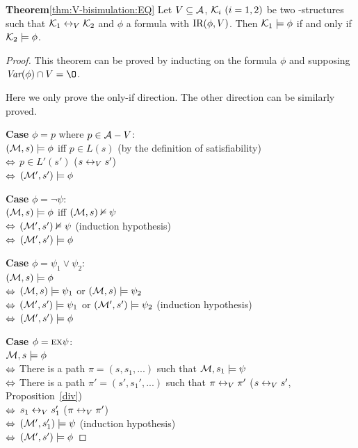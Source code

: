 \documentclass{article}
\begin{document}
\textbf{Theorem}\ref{thm:V-bisimulation:EQ}
Let $V\subseteq\cal A$, ${\cal K}_i~(i=1,2)$ be two \MPK-structures such that
  ${\cal K}_1\leftrightarrow_V{\cal K}_2$ and $\phi$ a formula with $\textrm{IR}(\phi,V)$. Then
  ${\cal K}_1\models\phi$ if and only if ${\cal K}_2\models\phi$.\\
\begin{proof}
This theorem can be proved by inducting on the formula $\phi$ and supposing $\Var(\phi) \cap V = \O$.

Here we only prove the only-if direction. The other direction can be similarly proved.

\textbf{Case} $\phi = p$ where $p \in {\cal A} - V$:\\
$({\cal M}, s) \models \phi$ iff $p\in L(s)$  \hfill  (by the definition of satisfiability) \\
$\Leftrightarrow$ $p \in L'(s')$ \hfill ($s \leftrightarrow_V s'$)\\
$\Leftrightarrow$ $({\cal M}', s') \models \phi$

\textbf{Case} $\phi = \neg \psi$:\\
$({\cal M}, s) \models \phi$ iff $({\cal M}, s) \nvDash \psi$ \\
$\Leftrightarrow$ $({\cal M}', s') \nvDash \psi$  \hfill   (induction hypothesis)\\
$\Leftrightarrow$ $({\cal M}', s') \models \phi$

\textbf{Case} $\phi = \psi_1 \vee \psi_2$:\\
$({\cal M}, s) \models \phi$\\
$\Leftrightarrow$ $({\cal M}, s) \models \psi_1$ or $({\cal M}, s) \models \psi_2$\\
$\Leftrightarrow$ $({\cal M}', s') \models \psi_1$ or $({\cal M}', s') \models \psi_2$   \hfill  (induction hypothesis)\\
$\Leftrightarrow$ $({\cal M}', s') \models \phi$

\textbf{Case} $\phi = \textsc{e} \textsc{x} \psi$:\\
${\cal M}, s \models \phi$ \\
$\Leftrightarrow$ There is a path $\pi = (s, s_1, ...)$ such that ${\cal M}, s_1 \models \psi$\\
$\Leftrightarrow$ There is a path $\pi' = (s', s_1', ...)$ such that $\pi \leftrightarrow_V \pi'$ \hfill   ($s \leftrightarrow_V s'$, Proposition~\ref{div})\\
$\Leftrightarrow$ $s_1 \leftrightarrow_V s_1'$  \hfill ($\pi \leftrightarrow_V \pi'$)\\
$\Leftrightarrow$ $({\cal M}', s_1') \models \psi$  \hfill  (induction hypothesis)\\
$\Leftrightarrow$ $({\cal M}', s') \models \phi$


\end{proof}
\end{document}
